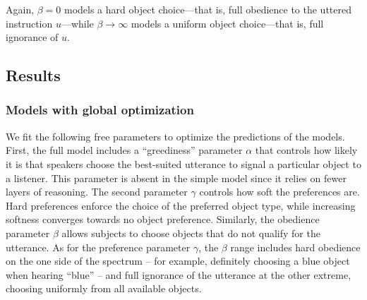 \documentclass[11pt,a4paper]{article}
\begin{document}
Again, $\beta=0$ models a hard object choice---that is, full obedience to the uttered instruction $u$---while $\beta \rightarrow \infty$ models a uniform object choice---that is, full ignorance of $u$.

\subsection{Results}
\subsubsection{Models with global optimization}

We fit the following free parameters to optimize the predictions of the models. First, the full model includes a ``greediness'' parameter $\alpha$ that controls how likely it is that speakers choose the best-suited utterance to signal a particular object to a listener. This parameter is absent in the simple model since it relies on fewer layers of reasoning. The second parameter $\gamma$ controls how soft the preferences are. 
Hard preferences enforce the choice of the preferred object type, while increasing softness converges towards no object preference. 
Similarly, the obedience parameter $\beta$ allows subjects to choose objects that do not qualify for the utterance. 
As for the preference parameter $\gamma$, the $\beta$ range includes hard obedience on the one side of the spectrum -- for example, definitely choosing a blue object when hearing ``blue'' -- and full ignorance of the utterance at the other extreme, choosing uniformly from all available objects. 
\end{document}
